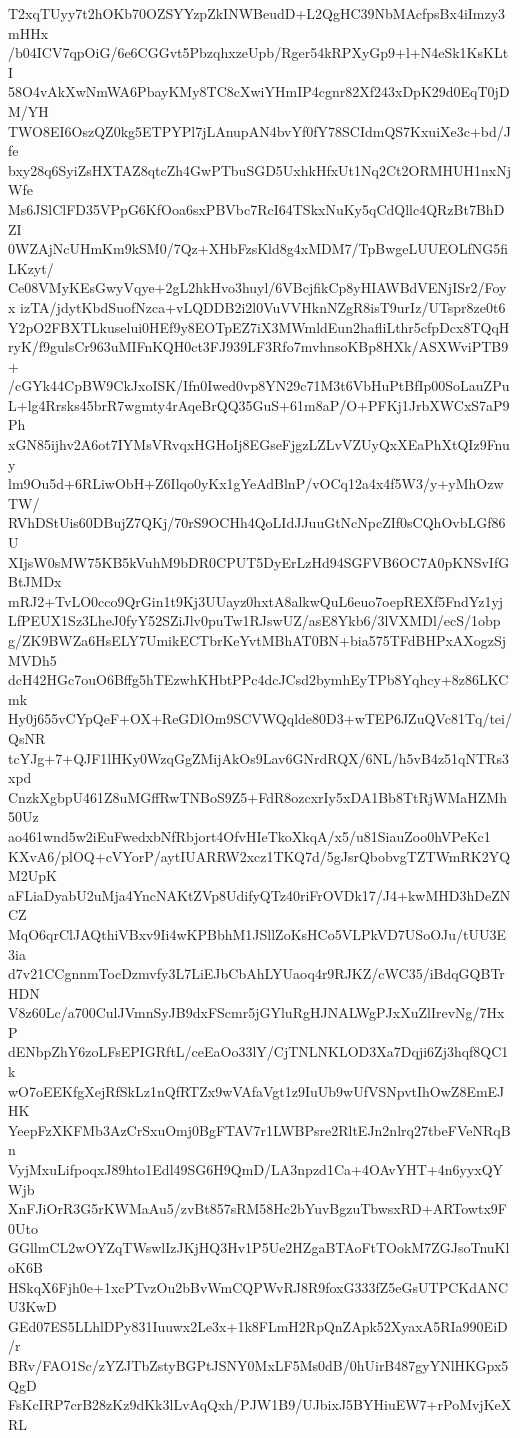 T2xqTUyy7t2hOKb70OZSYYzpZkINWBeudD+L2QgHC39NbMAcfpsBx4iImzy3mHHx
/b04ICV7qpOiG/6e6CGGvt5PbzqhxzeUpb/Rger54kRPXyGp9+l+N4eSk1KsKLtI
58O4vAkXwNmWA6PbayKMy8TC8cXwiYHmIP4cgnr82Xf243xDpK29d0EqT0jDM/YH
TWO8EI6OszQZ0kg5ETPYPl7jLAnupAN4bvYf0fY78SCIdmQS7KxuiXe3c+bd/Jfe
bxy28q6SyiZsHXTAZ8qtcZh4GwPTbuSGD5UxhkHfxUt1Nq2Ct2ORMHUH1nxNjWfe
Ms6JSlClFD35VPpG6KfOoa6sxPBVbc7RcI64TSkxNuKy5qCdQllc4QRzBt7BhDZI
0WZAjNcUHmKm9kSM0/7Qz+XHbFzsKld8g4xMDM7/TpBwgeLUUEOLfNG5fiLKzyt/
Ce08VMyKEsGwyVqye+2gL2hkHvo3huyl/6VBcjfikCp8yHIAWBdVENjISr2/Foyx
izTA/jdytKbdSuofNzca+vLQDDB2i2l0VuVVHknNZgR8isT9urIz/UTspr8ze0t6
Y2pO2FBXTLkuselui0HEf9y8EOTpEZ7iX3MWmldEun2hafliLthr5cfpDcx8TQqH
ryK/f9gulsCr963uMIFnKQH0ct3FJ939LF3Rfo7mvhnsoKBp8HXk/ASXWviPTB9+
/cGYk44CpBW9CkJxoISK/Ifn0Iwed0vp8YN29c71M3t6VbHuPtBfIp00SoLauZPu
L+lg4Rrsks45brR7wgmty4rAqeBrQQ35GuS+61m8aP/O+PFKj1JrbXWCxS7aP9Ph
xGN85ijhv2A6ot7IYMsVRvqxHGHoIj8EGseFjgzLZLvVZUyQxXEaPhXtQIz9Fnuy
lm9Ou5d+6RLiwObH+Z6Ilqo0yKx1gYeAdBlnP/vOCq12a4x4f5W3/y+yMhOzwTW/
RVhDStUis60DBujZ7QKj/70rS9OCHh4QoLIdJJuuGtNcNpcZIf0sCQhOvbLGf86U
XIjsW0sMW75KB5kVuhM9bDR0CPUT5DyErLzHd94SGFVB6OC7A0pKNSvIfGBtJMDx
mRJ2+TvLO0cco9QrGin1t9Kj3UUayz0hxtA8alkwQuL6euo7oepREXf5FndYz1yj
LfPEUX1Sz3LheJ0fyY52SZiJlv0puTw1RJswUZ/asE8Ykb6/3lVXMDl/ecS/1obp
g/ZK9BWZa6HsELY7UmikECTbrKeYvtMBhAT0BN+bia575TFdBHPxAXogzSjMVDh5
dcH42HGc7ouO6Bffg5hTEzwhKHbtPPc4dcJCsd2bymhEyTPb8Yqhcy+8z86LKCmk
Hy0j655vCYpQeF+OX+ReGDlOm9SCVWQqlde80D3+wTEP6JZuQVc81Tq/tei/QsNR
tcYJg+7+QJF1lHKy0WzqGgZMijAkOs9Lav6GNrdRQX/6NL/h5vB4z51qNTRs3xpd
CnzkXgbpU461Z8uMGffRwTNBoS9Z5+FdR8ozcxrIy5xDA1Bb8TtRjWMaHZMh50Uz
ao461wnd5w2iEuFwedxbNfRbjort4OfvHIeTkoXkqA/x5/u81SiauZoo0hVPeKc1
KXvA6/plOQ+cVYorP/aytIUARRW2xcz1TKQ7d/5gJsrQbobvgTZTWmRK2YQM2UpK
aFLiaDyabU2uMja4YncNAKtZVp8UdifyQTz40riFrOVDk17/J4+kwMHD3hDeZNCZ
MqO6qrClJAQthiVBxv9Ii4wKPBbhM1JSllZoKsHCo5VLPkVD7USoOJu/tUU3E3ia
d7v21CCgnnmTocDzmvfy3L7LiEJbCbAhLYUaoq4r9RJKZ/cWC35/iBdqGQBTrHDN
V8z60Lc/a700CulJVmnSyJB9dxFScmr5jGYluRgHJNALWgPJxXuZlIrevNg/7HxP
dENbpZhY6zoLFsEPIGRftL/ceEaOo33lY/CjTNLNKLOD3Xa7Dqji6Zj3hqf8QC1k
wO7oEEKfgXejRfSkLz1nQfRTZx9wVAfaVgt1z9IuUb9wUfVSNpvtIhOwZ8EmEJHK
YeepFzXKFMb3AzCrSxuOmj0BgFTAV7r1LWBPsre2RltEJn2nlrq27tbeFVeNRqBn
VyjMxuLifpoqxJ89hto1Edl49SG6H9QmD/LA3npzd1Ca+4OAvYHT+4n6yyxQYWjb
XnFJiOrR3G5rKWMaAu5/zvBt857sRM58Hc2bYuvBgzuTbwsxRD+ARTowtx9F0Uto
GGllmCL2wOYZqTWswlIzJKjHQ3Hv1P5Ue2HZgaBTAoFtTOokM7ZGJsoTnuKloK6B
HSkqX6Fjh0e+1xcPTvzOu2bBvWmCQPWvRJ8R9foxG333fZ5eGsUTPCKdANCU3KwD
GEd07ES5LLhlDPy831Iuuwx2Le3x+1k8FLmH2RpQnZApk52XyaxA5RIa990EiD/r
BRv/FAO1Sc/zYZJTbZstyBGPtJSNY0MxLF5Ms0dB/0hUirB487gyYNlHKGpx5QgD
FsKcIRP7crB28zKz9dKk3lLvAqQxh/PJW1B9/UJbixJ5BYHiuEW7+rPoMvjKeXRL
